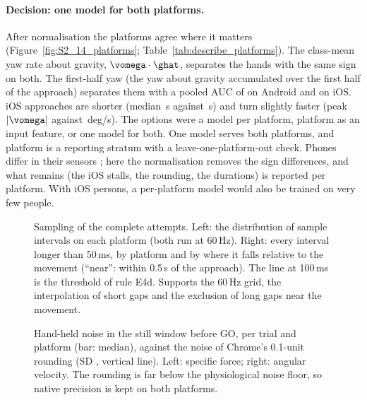 \paragraph{Decision: one model for both platforms.} After normalisation the platforms agree where it matters
(Figure~\ref{fig:S2_14_platforms}; Table~\ref{tab:describe_platforms}). The class-mean yaw rate about gravity,
$\vomega\cdot\ghat$, separates the hands with the same sign on both. The first-half yaw (the yaw about gravity
accumulated over the first half of the approach) separates them with a pooled AUC of
 on Android and  on iOS. iOS approaches are shorter (median
\,s against \,s) and turn slightly
faster (peak $|\vomega|$  against \,deg/s).
The options were a model per platform, platform as an input feature, or one model for both. One model serves
both platforms, and platform is a reporting stratum with a leave-one-platform-out check. Phones differ in their
sensors \cite{stisen2015heterogeneity}; here the normalisation removes the sign differences, and what remains
(the iOS stalls, the rounding, the durations) is reported per platform. With  iOS
persons, a per-platform model would also be trained on very few people.

\begin{figure}[htbp]
\centering
{}
\caption{Sampling of the complete attempts. Left: the distribution of sample intervals on each platform (both
run at 60\,Hz). Right: every interval longer than 50\,ms, by platform and by where it falls relative to the
movement (``near'': within 0.5\,s of the approach). The line at 100\,ms is the threshold of rule E4d. Supports
the 60\,Hz grid, the interpolation of short gaps and the exclusion of long gaps near the movement.}
\label{fig:S2_05_sampling_gaps}
\end{figure}


\begin{figure}[htbp]
\centering
{}
\caption{Hand-held noise in the still window before GO, per trial and platform (bar: median), against the
noise of Chrome's 0.1-unit rounding (SD , vertical line). Left: specific
force; right: angular velocity. The rounding is far below the physiological noise floor, so native precision
is kept on both platforms.}
\label{fig:S2_06_noise_vs_quantisation}
\end{figure}

